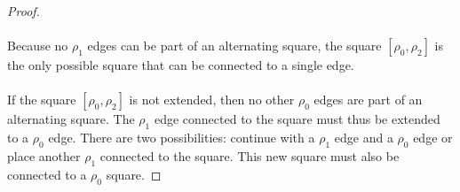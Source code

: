 \begin{proof}
  \paragraph{}
  Because no $\rho_1$ edges can be part of an alternating square, the square $[\rho_0, \rho_2]$ is the only possible square that can be connected to a single edge.

  \begin{figure}[H]
    \begin{center}
      \caption{}
    \end{center}
  \end{figure}

  \paragraph{}
  If the square $[\rho_0, \rho_2]$ is not extended, then no other $\rho_0$ edges are part of an alternating square. The $\rho_1$ edge connected to the square must thus be extended to a $\rho_0$ edge. There are two possibilities: continue with a $\rho_1$ edge and a $\rho_0$ edge or place another $\rho_1$ connected to the square. This new square must also be connected to a $\rho_0$ square.


\end{proof}
